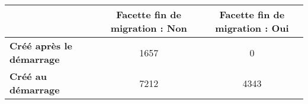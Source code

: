 \begin{tabular}{lcc}
\toprule
{} &  Facette fin de migration : Non &  Facette fin de migration : Oui \\
\midrule
\textbf{Créé après le démarrage} &                            1657 &                               0 \\
\textbf{Créé au démarrage      } &                            7212 &                            4343 \\
\bottomrule
\end{tabular}
